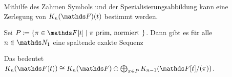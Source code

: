 \documentclass[ngerman,fontsize=11pt, paper=a4, parskip=half, titlepage=true, toc=bib]{scrartcl}
\begin{document}
Mithilfe des Zahmen Symbols und der Spezialisierungsabbildung kann
eine Zerlegung von $\KnF(t)$ bestimmt werden.

\begin{Satz}\label{milnorfolge}
  Sei $P\coloneqq \{\pi\in \F[t]\mid \pi\text{ prim, normiert }\}$.
  Dann gibt es für alle $n\in\N_1$ eine spaltende exakte Sequenz
  \begin{center}
  \end{center}
  Das bedeutet
  $\K_n(\Ft )\cong\KnF\oplus\bigoplus_{\pi\in P}K_{n-1}(\F[t]/(\pi))$.
\end{Satz}
\end{document}
